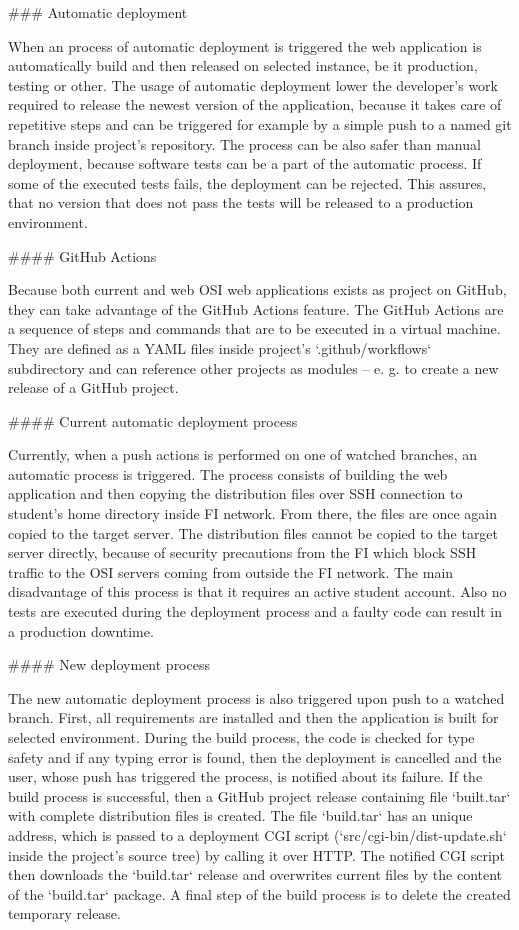 \documentclass[
  digital, %
  oneside, %
  lof,     %
  lot,     %
]{fithesis4}
\begin{document}
{### Automatic deployment
\label{chap:autodeploy}

When an process of automatic deployment is triggered the web application is automatically build and then released on selected instance, be it production, testing or other. The usage of automatic deployment lower the developer's work required to release the newest version of the application, because it takes care of repetitive steps and can be triggered for example by a simple push to a named git branch inside project's repository. The process can be also safer than manual deployment, because software tests can be a part of the automatic process. If some of the executed tests fails, the deployment can be rejected. This assures, that no version that does not pass the tests will be released to a production environment.

#### GitHub Actions

Because both current and web OSI web applications exists as project on GitHub, they can take advantage of the GitHub Actions feature. The GitHub Actions are a sequence of steps and commands that are to be executed in a virtual machine. They are defined as a YAML files inside project's `.github/workflows` subdirectory and can reference other projects as modules -- e. g. to create a new release of a GitHub project.

#### Current automatic deployment process

Currently, when a push actions is performed on one of watched branches, an automatic process is triggered. The process consists of building the web application and then copying the distribution files over SSH connection to student's home directory inside FI network. From there, the files are once again copied to the target server. The distribution files cannot be copied to the target server directly, because of security precautions from the FI which block SSH traffic to the OSI servers coming from outside the FI network. The main disadvantage of this process is that it requires an active student account. Also no tests are executed during the deployment process and a faulty code can result in a production downtime.

#### New deployment process

The new automatic deployment process is also triggered upon push to a watched branch. First, all requirements are installed and then the application is built for selected environment. During the build process, the code is checked for type safety and if any typing error is found, then the deployment is cancelled and the user, whose push has triggered the process, is notified about its failure. If the build process is successful, then a GitHub project release containing file `built.tar` with complete distribution files is created. The file `build.tar` has an unique address, which is passed to a deployment CGI script (`src/cgi-bin/dist-update.sh` inside the project's source tree) by calling it over HTTP. The notified CGI script then downloads the `build.tar` release and overwrites current files by the content of the `build.tar` package. A final step of the build process is to delete the created temporary release.

}
\end{document}
